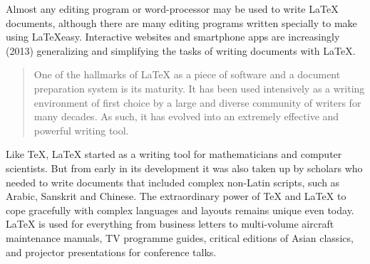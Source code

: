 \documentclass[10pt, letterpaper]{notes}
\begin{document}




Almost any editing program or word-processor may be used to write LaTeX documents, although there are many editing programs written specially to make using \LaTeX easy. Interactive websites and smartphone apps are increasingly (2013) generalizing and simplifying the tasks of writing documents with \LaTeX.
\begin{quote}
One of the hallmarks of LaTeX as a piece of software and a document preparation system is its maturity. It has been used intensively as a writing environment of first choice by a large and diverse community of writers for many decades. As such, it has evolved into an extremely effective and powerful writing tool.
\end{quote}
Like TeX, LaTeX started as a writing tool for mathematicians and computer scientists. But from early in its development it was also taken up by scholars who needed to write documents that included complex non-Latin scripts, such as Arabic, Sanskrit and Chinese. The extraordinary power of TeX and LaTeX to cope gracefully with complex languages and layouts remains unique even today. LaTeX is used for everything from business letters to multi-volume aircraft maintenance manuals, TV programme guides, critical editions of Asian classics, and projector presentations for conference talks.
\end{document}
